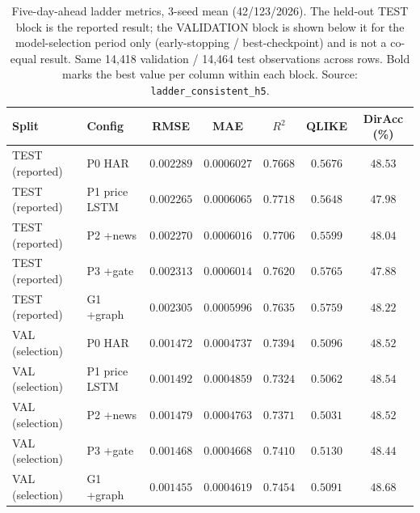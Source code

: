 \documentclass[runningheads]{llncs}
\newcommand{\nval}{14{,}418}
\newcommand{\ntest}{14{,}464}
\newcommand{\nseed}{3}
\begin{document}
\begin{table}[t]
\caption{Five-day-ahead ladder metrics, \nseed-seed mean (42/123/2026). The held-out TEST block is the
reported result; the VALIDATION block is shown below it for the model-selection period only
(early-stopping / best-checkpoint) and is not a co-equal result. Same \nval{} validation / \ntest{} test
observations across rows. Bold marks the best value per column within each block. Source:
\texttt{ladder\_consistent\_h5}.}
\label{tab:ladder}
\centering
\begin{tabular}{llccccc}
\toprule
Split & Config & RMSE & MAE & $R^2$ & QLIKE & DirAcc (\%) \\
\midrule
TEST (reported) & P0 HAR         & $0.002289$          & $0.0006027$          & $0.7668$          & $0.5676$          & $\mathbf{48.53}$ \\
TEST (reported) & P1 price LSTM  & $\mathbf{0.002265}$ & $0.0006065$          & $\mathbf{0.7718}$ & $0.5648$          & $47.98$ \\
TEST (reported) & P2 +news       & $0.002270$          & $0.0006016$          & $0.7706$          & $\mathbf{0.5599}$ & $48.04$ \\
TEST (reported) & P3 +gate       & $0.002313$          & $0.0006014$          & $0.7620$          & $0.5765$          & $47.88$ \\
TEST (reported) & G1 +graph      & $0.002305$          & $\mathbf{0.0005996}$ & $0.7635$          & $0.5759$          & $48.22$ \\
\midrule
VAL (selection)  & P0 HAR         & $0.001472$          & $0.0004737$          & $0.7394$          & $0.5096$          & $48.52$ \\
VAL (selection)  & P1 price LSTM  & $0.001492$          & $0.0004859$          & $0.7324$          & $0.5062$          & $48.54$ \\
VAL (selection)  & P2 +news       & $0.001479$          & $0.0004763$          & $0.7371$          & $\mathbf{0.5031}$ & $48.52$ \\
VAL (selection)  & P3 +gate       & $0.001468$          & $0.0004668$          & $0.7410$          & $0.5130$          & $48.44$ \\
VAL (selection)  & G1 +graph      & $\mathbf{0.001455}$ & $\mathbf{0.0004619}$ & $\mathbf{0.7454}$ & $0.5091$          & $\mathbf{48.68}$ \\
\bottomrule
\end{tabular}
\end{table}
\end{document}
